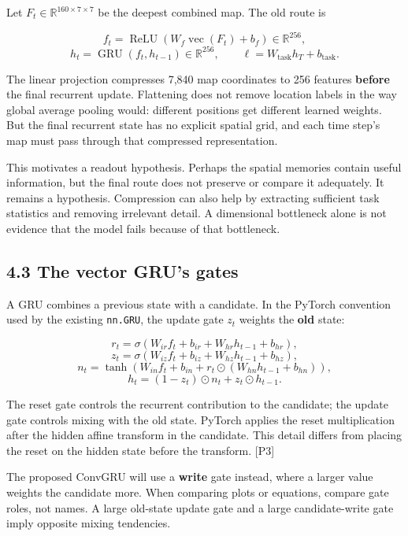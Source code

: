 \documentclass[
  11pt,
]{article}
\let\oldsubsection\subsection
\renewcommand{\subsection}{\Needspace{6\baselineskip}\oldsubsection}
\begin{document}
Let \(F_t\in\mathbb R^{160\times7\times7}\) be the deepest combined map.
The old route is

\[f_t=\operatorname{ReLU}(W_f\operatorname{vec}(F_t)+b_f)\in\mathbb R^{256},\]
\[h_t=\operatorname{GRU}(f_t,h_{t-1})\in\mathbb R^{256},\qquad
\ell=W_{\mathrm{task}}h_T+b_{\mathrm{task}}.\]

The linear projection compresses 7,840 map coordinates to 256 features
\textbf{before} the final recurrent update. Flattening does not remove
location labels in the way global average pooling would: different
positions get different learned weights. But the final recurrent state
has no explicit spatial grid, and each time step's map must pass through
that compressed representation.

This motivates a readout hypothesis. Perhaps the spatial memories
contain useful information, but the final route does not preserve or
compare it adequately. It remains a hypothesis. Compression can also
help by extracting sufficient task statistics and removing irrelevant
detail. A dimensional bottleneck alone is not evidence that the model
fails because of that bottleneck.

\subsection{4.3 The vector GRU's gates}\label{the-vector-grus-gates}

A GRU combines a previous state with a candidate. In the PyTorch
convention used by the existing \texttt{nn.GRU}, the update gate \(z_t\)
weights the \textbf{old} state:

\[r_t=\sigma(W_{ir}f_t+b_{ir}+W_{hr}h_{t-1}+b_{hr}),\]
\[z_t=\sigma(W_{iz}f_t+b_{iz}+W_{hz}h_{t-1}+b_{hz}),\]
\[n_t=\tanh\!\left(W_{in}f_t+b_{in}+r_t\odot(W_{hn}h_{t-1}+b_{hn})\right),\]
\[h_t=(1-z_t)\odot n_t+z_t\odot h_{t-1}.\]

The reset gate controls the recurrent contribution to the candidate; the
update gate controls mixing with the old state. PyTorch applies the
reset multiplication after the hidden affine transform in the candidate.
This detail differs from placing the reset on the hidden state before
the transform. {[}P3{]}

The proposed ConvGRU will use a \textbf{write} gate instead, where a
larger value weights the candidate more. When comparing plots or
equations, compare gate roles, not names. A large old-state update gate
and a large candidate-write gate imply opposite mixing tendencies.
\end{document}
